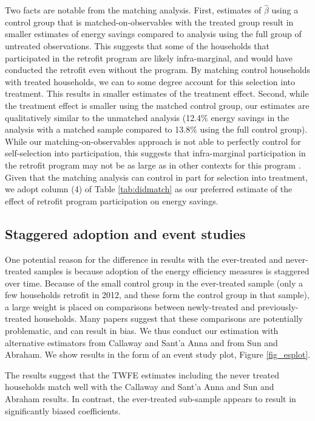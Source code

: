 \documentclass{article}
\begin{document}
Two facts are notable from the matching analysis.  First, estimates of $\hat{\beta}$ using a control group that is matched-on-observables with the treated group result in smaller estimates of energy savings compared to analysis using the full group of untreated observations. This suggests that some of the households that participated in the retrofit program are likely infra-marginal, and would have conducted the retrofit even without the program. By matching control households with treated households, we can to some degree account for this selection into treatment. This results in smaller estimates of the treatment effect. Second, while the treatment effect is smaller using the matched control group, our estimates are qualitatively similar to the unmatched analysis (12.4\% energy savings in the analysis with a matched sample compared to 13.8\% using the full control group). While our matching-on-observables approach is not able to perfectly control for self-selection into participation, this suggests that infra-marginal participation in the retrofit program may not be as large as in other contexts for this program \citep{grosche2009willingness, rivers2016free, boomhower2014credible}. Given that the matching analysis can control in part for selection into treatment, we adopt column (4) of Table \ref{tab:didmatch} as our preferred estimate of the effect of retrofit program participation on energy savings.



\subsection{Staggered adoption and event studies}
One potential reason for the difference in results with the ever-treated and never-treated samples is because adoption of the energy efficiency measures is staggered over time. Because of the small control group in the ever-treated sample (only a few households retrofit in 2012, and these form the control group in that sample), a large weight is placed on comparisons between newly-treated and previously-treated households. Many papers suggest that these comparisons are potentially problematic, and can result in bias.  We thus conduct our estimation with alternative estimators from Callaway and Sant'a Anna and from Sun and Abraham.  We show results in the form of an event study plot, Figure \ref{fig_esplot}.

The results suggest that the TWFE estimates including the never treated households match well with the Callaway and Sant'a Anna and Sun and Abraham results.  In contrast, the ever-treated sub-sample appears to result in significantly biased coefficients.
\end{document}

